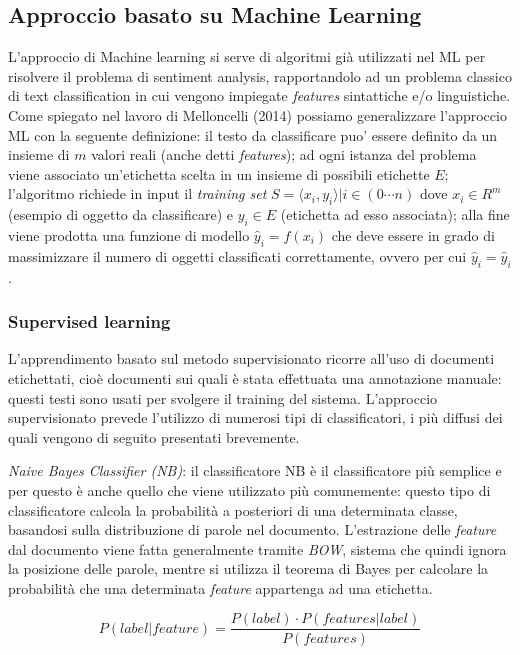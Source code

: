 \documentclass[a4paper,12pt,openright,twoside]{report}
\theoremstyle{definition}
\begin{document}
\subsection{Approccio basato su Machine Learning}
L'approccio di Machine learning si serve di algoritmi già utilizzati nel ML per risolvere il problema
di sentiment analysis, rapportandolo ad un problema classico di text classification 
in cui vengono impiegate
\emph{features} sintattiche e/o linguistiche.
Come spiegato nel lavoro di Melloncelli (2014) %
possiamo generalizzare l'approccio ML con la seguente
definizione: il testo da classificare puo' essere definito da un insieme
di $m$ valori reali (anche detti \emph{features}); ad ogni istanza del problema viene associato
un'etichetta scelta in un insieme di possibili etichette $E$; l’algoritmo richiede in input il
\emph{training set} $S = {\langle x_i , y_i\rangle | i \in (0 \cdots n)}$ dove $x_i \in R^m$
(esempio di oggetto da classificare)
e $y_i \in E$ (etichetta ad esso associata); alla fine viene prodotta una funzione di modello 
$\hat{y}_i = f(x_i)$ che deve essere in grado di massimizzare il numero di oggetti classificati
correttamente, ovvero per cui $\hat{y}_i = \hat{y}_i$.

\subsubsection{Supervised learning}
L’apprendimento basato sul metodo supervisionato ricorre all'uso di documenti etichettati,
cioè documenti sui quali è stata effettuata una annotazione manuale: questi 
testi sono usati
per svolgere il training del sistema. L'approccio supervisionato prevede l'utilizzo
di numerosi tipi di classificatori, i più diffusi dei quali vengono di seguito
presentati brevemente.

\emph{Naive Bayes Classifier (NB)}: il classificatore NB è il classificatore più semplice
e per questo è anche quello che viene utilizzato più comunemente: questo tipo di classificatore calcola
la probabilità a posteriori di una determinata classe, basandosi sulla distribuzione
di parole nel documento. L'estrazione delle \emph{feature} dal documento viene fatta
generalmente 
tramite \emph{BOW}, sistema che quindi ignora la posizione delle parole, mentre si utilizza il
teorema di Bayes per calcolare la probabilità che una determinata \emph{feature}
appartenga ad una etichetta.

\begin{equation}
	P(label|feature)=\frac{P(label)\cdot{}P(features|label)}{P(features)}
	\label{Bayes}
\end{equation}
\end{document}
